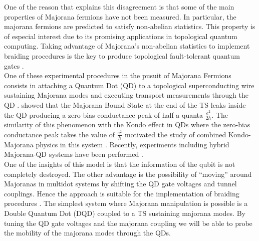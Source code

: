 \documentclass[showpacs,aps,prb,reprint,superscriptaddress]{revtex4-1}
\begin{document}
One of the reason that explains this disagreement is that some of the main properties of Majorana fermions have not been measured. In particular, the majorana fermions are predicted to satisfy non-abelian statistics. This property is of especial interest due to its promising applications in topological quantum computing. Taking advantage of Majorana's non-abelian statistics to implement braiding procedures is the key to produce topological fault-tolerant quantum gates \cite{sarma_majorana_2015}. \\


One of these experimental procedures in the pusuit of Majorana Fermions consists in attaching a Quantum Dot (QD) to a topological superconducting wire sustaining Majorana  modes and executing transport measurements through the QD \cite{liu_detecting_2011} . \citeauthor{vernek_subtle_2014} showed that the Majorana Bound State at the end of the TS leaks inside the QD producing a zero-bias conductance peak of half a quanta $\frac{e^{2}}{2h}$.  The similarity of this phenomenon with the Kondo effect in QDs where the zero-bias conductance peak takes the value of  $\frac{e^{2}}{h}$ motivated the study of combined Kondo-Majorana physics in this system \cite{lee_kondo_2013,ruiz-tijerina_interaction_2015}.  Recently, experiments including hybrid Majorana-QD systems have been performed \cite{deng_majorana_2016} .  \\

 One of the insights of this model is that the information of the qubit is not completely destroyed. The other advantage  is the possibility of “moving” around Majoranas  in multidot systems by shifting the QD gate voltages and tunnel couplings. Hence the approach is suitable for the implementation of braiding procedures . The simplest system where Majorana manipulation is possible is  a  Double Quantum Dot (DQD) coupled to a TS sustaining majorana modes. By tuning the QD gate voltages and the majorana coupling we will be able to probe the mobility of the majorana modes through the QDs. 
 
\end{document}
